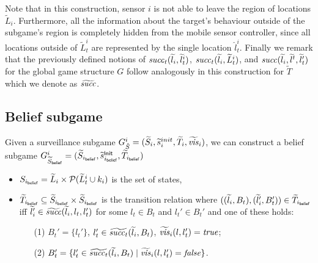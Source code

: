 Note that in this construction, sensor $i$ is not able to leave the region of locations $\widetilde{L}_i$. Furthermore, all the information about the target's behaviour outside of  the subgame's region is completely hidden from the mobile sensor controller, since all locations outside of  $\widetilde{L}_t^i$ are represented by the single location $\hat{l}_t^i$.
Finally we remark that the previously defined notions of $\mathit{succ}_t(\widetilde{l}_i,\widetilde{l}^i_{t})$, $\mathit{succ}_t(\widetilde{l}_i,\widetilde{L}^i_{t})$, and $\mathit{succ}(\widetilde{l}_i,\widetilde{l}^{t},\widetilde{l}_{t}')$ for the global game structure $G$ follow analogously in this construction for $\widetilde{T}$ which we denote as $\widetilde{\mathit{succ}}$.

\subsection{Belief subgame}
Given a surveillance subgame $G^{i}_{\hat{S}} = (\widetilde{S}_i,\widetilde{s}_i^{init},\widetilde{T}_i,\widetilde{\mathit{vis}}_i)$, we can construct a belief subgame $G^{i}_{\widetilde{S}_{\mathsf{belief}}} = (\widetilde{S}_{i_{\mathsf{belief}}},\widetilde{s}^{\mathsf{init}}_{i_{\mathsf{belief}}},\widetilde{T}_{i_{\mathsf{belief}}})$ 

\begin{itemize}
\item $S_{i_{\mathsf{belief}}} = \widetilde{L}_i \times \mathcal{P}(\widetilde{L}^i_t \cup k_i)$ is the set of states,
\item $\widetilde{T}_{i_{\mathsf{belief}}} \subseteq \widetilde{S}_{i_{\mathsf{belief}}} \times \widetilde{S}_{i_{\mathsf{belief}}}$ is the transition relation where $((\widetilde{l}_i, B_t),(\widetilde{l}_i', B_t')) \in \widetilde{T}_{i_{\mathsf{belief}}}$ iff $\widetilde{l}_i' \in  \widetilde{\mathit{succ}}(\widetilde{l}_i,l_t,l_t')$ for some $l_t \in B_t$ and $l_t' \in B_t'$ and one of these holds:
\begin{itemize}
\item[(1)] $B_t' = \{l_t'\}$, $l_t' \in \widetilde{\mathit{succ}_t}(\widetilde{l}_i,B_t)$, $\widetilde{\mathit{vis}}_i(l,l_t') = \mathit{true}$;
\item[(2)] $B_t' = \{l_t' \in \widetilde{\mathit{succ}_t}(\widetilde{l}_i,B_t)  \mid  \widetilde{\mathit{vis}}_i(l,l_t') = \mathit{false} \}$.
\end{itemize}
\end{itemize}


